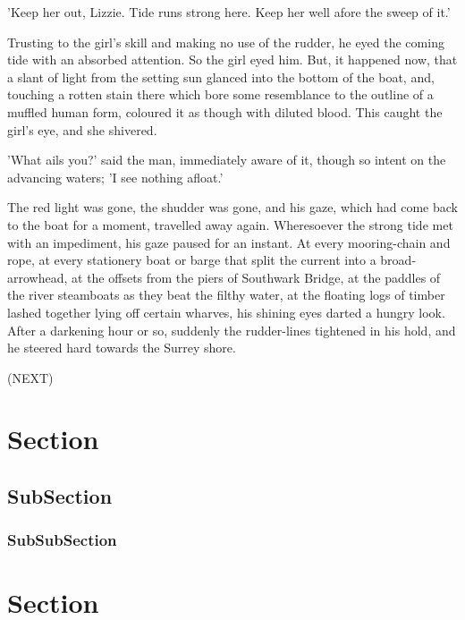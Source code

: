 \documentclass[12pt]{article}
\begin{document}
'Keep her out, Lizzie. Tide runs strong here. Keep her well afore
the sweep of it.'

Trusting to the girl's skill and making no use of the rudder, he eyed
the coming tide with an absorbed attention. So the girl eyed him.
But, it happened now, that a slant of light from the setting sun
glanced into the bottom of the boat, and, touching a rotten stain
there which bore some resemblance to the outline of a muffled
human form, coloured it as though with diluted blood. This caught
the girl's eye, and she shivered.

'What ails you?' said the man, immediately aware of it, though so
intent on the advancing waters; 'I see nothing afloat.'

The red light was gone, the shudder was gone, and his gaze, which
had come back to the boat for a moment, travelled away again.
Wheresoever the strong tide met with an impediment, his gaze
paused for an instant. At every mooring-chain and rope, at every
stationery boat or barge that split the current into a broad-
arrowhead, at the offsets from the piers of Southwark Bridge, at the
paddles of the river steamboats as they beat the filthy water, at the
floating logs of timber lashed together lying off certain wharves,
his shining eyes darted a hungry look. After a darkening hour or
so, suddenly the rudder-lines tightened in his hold, and he steered
hard towards the Surrey shore.

(NEXT)

\section{Section}

\lipsum

\subsection{SubSection}

\lipsum

\subsubsection{SubSubSection}

\lipsum

\newpage

\section{Section}

\lipsum

\end{document}
